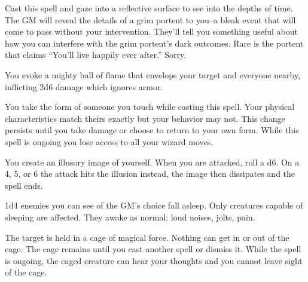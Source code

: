 
Cast this spell and gaze into a reflective surface to see into the depths of time. The GM will reveal the details of a grim portent to you--a bleak event that will come to pass without your intervention. They'll tell you something useful about how you can interfere with the grim portent's dark outcomes. Rare is the portent that claims ``You'll live happily ever after.'' Sorry.



You evoke a mighty ball of flame that envelops your target and everyone nearby, inflicting 2d6 damage which ignores armor.
\newpage
{}


You take the form of someone you touch while casting this spell. Your physical characteristics match theirs exactly but your behavior may not. This change persists until you take damage or choose to return to your own form. While this spell is ongoing you lose access to all your wizard moves.



You create an illusory image of yourself. When you are attacked, roll a d6. On a 4, 5, or 6 the attack hits the illusion instead, the image then dissipates and the spell ends.



1d4 enemies you can see of the GM's choice fall asleep. Only creatures capable of sleeping are affected. They awake as normal: loud noises, jolts, pain.



The target is held in a cage of magical force. Nothing can get in or out of the cage. The cage remains until you cast another spell or dismiss it. While the spell is ongoing, the caged creature can hear your thoughts and you cannot leave sight of the cage.



